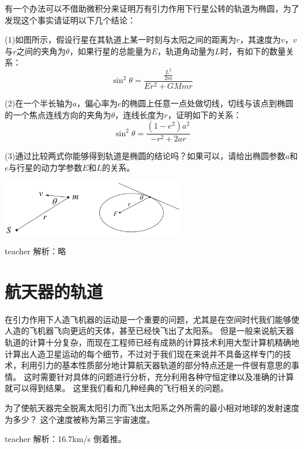 \begin{example}

有一个办法可以不借助微积分来证明万有引力作用下行星公转的轨道为椭圆，为了发现这个事实请证明以下几个结论：

(1)如图所示，假设行星在其轨道上某一时刻与太阳之间的距离为$r$，其速度为$v$，$v$与$r$之间的夹角为$\theta$，如果行星的总能量为$E$，轨道角动量为$L$时，有如下的数量关系：
\[\sin^2\theta = \frac{\frac{L^2}{2m}}{Er^2 +GMmr}\]

(2)在一个半长轴为$a$，偏心率为$e$的椭圆上任意一点处做切线，切线与该点到椭圆的一个焦点连线方向的夹角为$\theta$，连线长度为$r$，证明如下的关系：
\[
\sin^2\theta = \frac{(1-e^2)a^2}{-r^2+2ar}
\]

(3)通过比较两式你能够得到轨道是椭圆的结论吗？如果可以，请给出椭圆参数$a$和$e$与行星的动力学参数$E$和$L$的关系。
\begin{center}
\includegraphics[width = 0.6\textwidth]{images/gravity-2.pdf}
\end{center}
\begin{taggedblock}{teacher}
\noindent
解析：略
\end{taggedblock}
\end{example}

\section{航天器的轨道}
在引力作用下人造飞机器的运动是一个重要的问题，尤其是在空间时代我们能够使人造的飞机器飞向更远的天体，甚至已经快飞出了太阳系。
但是一般来说航天器轨道的计算十分复杂，而现在工程师已经有成熟的计算技术利用大型计算机精确地计算出人造卫星运动的每个细节，不过对于我们现在来说并不具备这样专门的技术，利用引力的基本性质部分地计算航天器轨道的部分特点还是一件很有意思的事情。
这时需要针对具体的问题进行分析，充分利用各种守恒定律以及准确的计算就可以得到结果。
这里我们看和几种经典的飞行相关的问题。

\begin{example}
为了使航天器完全脱离太阳引力而飞出太阳系之外所需的最小相对地球的发射速度为多少？
这个速度被称为第三宇宙速度。
\begin{taggedblock}{teacher}
\newline
解析：16.7km/s 倒着推。
\end{taggedblock}
\end{example}

